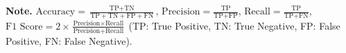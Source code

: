 \documentclass[conference]{IEEEtran}
\begin{document}
\begin{table}[ht]
\begin{tabular}{ l|l|l | c c c c }
\hline
\end{tabular}
\vspace{-2pt}   %
\begin{flushleft}
\begin{adjustwidth}{2pt}{2pt}  %
\textbf{Note.}
$\text{Accuracy} = \frac{\text{TP} + \text{TN}}{\text{TP} + \text{TN} + \text{FP} + \text{FN}}$,
$\text{Precision} = \frac{\text{TP}}{\text{TP} + \text{FP}}$,
$\text{Recall} = \frac{\text{TP}}{\text{TP} + \text{FN}}$,
$\text{F1 Score} = 2 \times \frac{\text{Precision} \times \text{Recall}}{\text{Precision} + \text{Recall}}$ 
(TP: True Positive, TN: True Negative, FP: False Positive, FN: False Negative).
\end{adjustwidth}
\end{flushleft}
\label{tab:performance_comparison_scheme}
\end{table}




\end{document}
